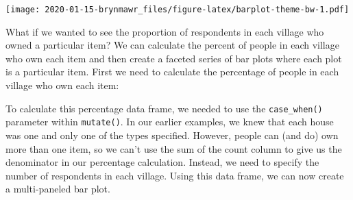\documentclass[]{book}
\newenvironment{Shaded}{\begin{snugshade}}{\end{snugshade}}
\newcommand{\KeywordTok}[1]{\textcolor[rgb]{0.13,0.29,0.53}{\textbf{#1}}}
\newcommand{\DataTypeTok}[1]{\textcolor[rgb]{0.13,0.29,0.53}{#1}}
\newcommand{\DecValTok}[1]{\textcolor[rgb]{0.00,0.00,0.81}{#1}}
\newcommand{\StringTok}[1]{\textcolor[rgb]{0.31,0.60,0.02}{#1}}
\newcommand{\OperatorTok}[1]{\textcolor[rgb]{0.81,0.36,0.00}{\textbf{#1}}}
\newcommand{\NormalTok}[1]{#1}
\begin{document}
\texttt{[image: 2020-01-15-brynmawr\_files/figure-latex/barplot-theme-bw-1.pdf]}

What if we wanted to see the proportion of respondents in each village
who owned a particular item? We can calculate the percent of people in
each village who own each item and then create a faceted series of bar
plots where each plot is a particular item. First we need to calculate
the percentage of people in each village who own each item:

\begin{Shaded}
\end{Shaded}

To calculate this percentage data frame, we needed to use the
\texttt{case\_when()} parameter within \texttt{mutate()}. In our earlier
examples, we knew that each house was one and only one of the types
specified. However, people can (and do) own more than one item, so we
can't use the sum of the count column to give us the denominator in our
percentage calculation. Instead, we need to specify the number of
respondents in each village. Using this data frame, we can now create a
multi-paneled bar plot.
\end{document}
